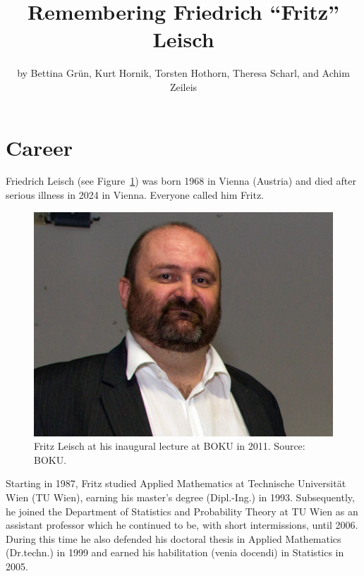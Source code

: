 \title{Remembering Friedrich ``Fritz'' Leisch}


\author{by Bettina Grün, Kurt Hornik, Torsten Hothorn, Theresa Scharl, and Achim Zeileis}

\maketitle


\section{Career}\label{career}

Friedrich Leisch (see Figure~\ref{fig:leisch}) was born 1968 in Vienna (Austria) and
died after serious illness in 2024 in Vienna. Everyone called him Fritz.

\begin{figure}[h!]

{\centering \includegraphics[width=0.55\linewidth]{figures/img-leisch} 

}

\caption{Fritz Leisch at his inaugural lecture at BOKU in 2011. Source: BOKU.}\label{fig:leisch}
\end{figure}

Starting in 1987, Fritz studied Applied Mathematics at Technische Universität Wien (TU Wien),
earning his master's degree (Dipl.-Ing.) in 1993. Subsequently, he joined the
Department of Statistics and Probability Theory at TU Wien as an
assistant professor which he continued to be, with short intermissions, until 2006.
During this time he also defended his doctoral thesis in Applied Mathematics (Dr.techn.)
in 1999 and earned his habilitation (venia docendi) in Statistics in 2005.

